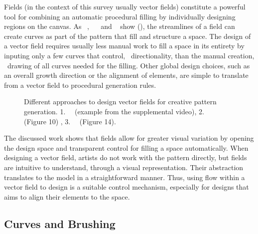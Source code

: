 Fields (in the context of this survey usually vector fields) constitute a powerful tool for combining an automatic procedural filling by individually designing regions on the canvas. As \citeauthor*{hsu_2020_aef}~\cite{hsu_2020_aef}, ~\citeauthor*{saputra_2017_ffo}~\cite{saputra_2017_ffo} and \citeauthor*{gieseke_2017_ooo}~\cite{gieseke_2017_ooo} show (), the streamlines of a field can create curves as part of the pattern that fill and structure a space. The design of a vector field requires usually less manual work to fill a space in its entirety by inputing only a few curves that control, \eg~directionality, than the manual creation, \eg~drawing of all curves needed for the filling. Other global design choices, such as an overall growth direction or the alignment of elements, are simple to translate from a vector field to procedural generation rules.

\begin{figure}
    \centering
    \caption{\label{fig:fields}Different approaches to design vector fields for creative pattern generation. 1.~\citeauthor*{gieseke_2017_ooo}~\cite{gieseke_2017_ooo} (example from the supplemental video), 2.~\citeauthor*{hsu_2020_aef}~\cite{hsu_2020_aef} (Figure 10) \color{orange}{Status rights: invoice received}\color{black}, 3.~\citeauthor*{saputra_2017_ffo}~\cite{saputra_2017_ffo} (Figure 14).}
\end{figure}

The discussed work shows that fields allow for greater visual variation by opening the design space and transparent control for filling a space automatically. When designing a vector field, artists do not work with the pattern directly, but fields are intuitive to understand, \eg through a visual representation. Their abstraction translates to the model in a straightforward manner. Thus, using flow within a vector field to design is a suitable control mechanism, especially for designs that aims to align their elements to the space.


\subsection{Curves and Brushing}
\label{subsubsec:analysis_creative_means_curves}

